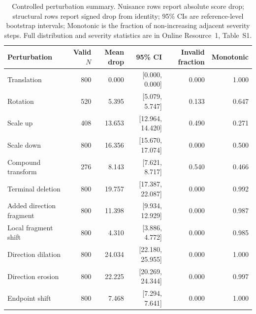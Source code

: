 \begin{table}[t]
\caption{Controlled perturbation summary. Nuisance rows report absolute score
drop; structural rows report signed drop from identity; 95\% CIs are
reference-level bootstrap intervals; Monotonic is the fraction of
non-increasing adjacent severity steps. Full distribution and
severity statistics are in Online Resource~1, Table~S1.}
\label{tab:controlled}
\centering
\scriptsize
\begin{tabular}{lrrrrr}
\toprule
Perturbation & Valid \(N\) & Mean drop & 95\% CI & Invalid fraction & Monotonic \\
\midrule
Translation & 800 & 0.000 & [0.000, 0.000] & 0.000 & 1.000 \\
Rotation & 520 & 5.395 & [5.079, 5.747] & 0.133 & 0.647 \\
Scale up & 408 & 13.653 & [12.964, 14.420] & 0.490 & 0.271 \\
Scale down & 800 & 16.356 & [15.670, 17.074] & 0.000 & 0.500 \\
Compound transform & 276 & 8.143 & [7.621, 8.717] & 0.540 & 0.466 \\
Terminal deletion & 800 & 19.757 & [17.387, 22.087] & 0.000 & 0.992 \\
Added direction fragment & 800 & 11.398 & [9.934, 12.929] & 0.000 & 0.987 \\
Local fragment shift & 800 & 4.310 & [3.886, 4.772] & 0.000 & 0.985 \\
Direction dilation & 800 & 24.034 & [22.180, 25.955] & 0.000 & 1.000 \\
Direction erosion & 800 & 22.225 & [20.269, 24.344] & 0.000 & 0.997 \\
Endpoint shift & 800 & 7.468 & [7.294, 7.641] & 0.000 & 1.000 \\
\bottomrule
\end{tabular}
\end{table}
